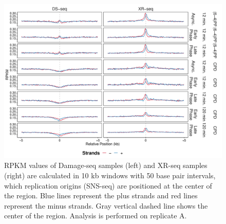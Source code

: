 \begin{figure}[H]
\begin{center}
\includegraphics[width=\textwidth]{Chapters/7_appendix/figures/supfig46}
\caption[Damage and repair events of replication origins in 10 kb (replicate A).]{RPKM values of Damage-seq samples (left) and XR-seq samples (right) are calculated in 10 kb windows with 50 base pair intervals, which replication origins (SNS-seq) are positioned at the center of the region. Blue lines represent the plus strands and red lines represent the minus strands. Gray vertical dashed line shows the center of the region. Analysis is performed on replicate A.}
\label{supfig:rpkm10snsA}
\end{center}
\end{figure}

